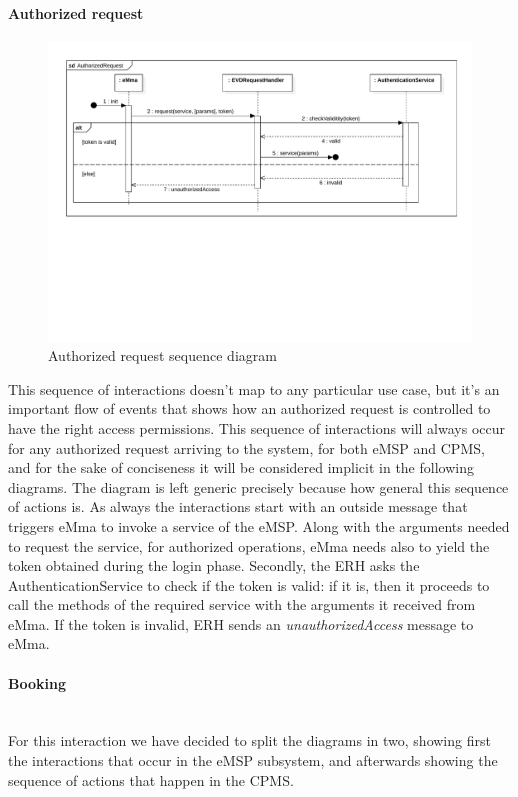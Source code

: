\paragraph{Authorized request}\mbox{}
\begin{figure}[H]
    \centering
    \includegraphics[trim={0 8.5cm 0 0},clip, width=1\textwidth]{Images/cp2/runtime/AuthorizedRequest.pdf}
    \caption{Authorized request sequence diagram}
    \label{fig:auth_request}
\end{figure}
This sequence of interactions doesn't map to any particular use case, but it's an important flow of events that shows how an authorized request is controlled to have the right access permissions. This sequence of interactions will always occur for any authorized request arriving to the system, for both eMSP and CPMS, and for the sake of conciseness it will be considered implicit in the following diagrams. The diagram is left generic precisely because how general this sequence of actions is. As always the interactions start with an outside message that triggers eMma to invoke a service of the eMSP. Along with the arguments needed to request the service, for authorized operations, eMma needs also to yield the token obtained during the login phase. Secondly, the ERH asks the AuthenticationService to check if the token is valid: if it is, then it proceeds to call the methods of the required service with the arguments it received from eMma. If the token is invalid, ERH sends an \textit{unauthorizedAccess} message to eMma.
\pagebreak

\paragraph{Booking}\mbox{}\\
For this interaction we have decided to split the diagrams in two, showing first the interactions that occur in the eMSP subsystem, and afterwards showing the sequence of actions that happen in the CPMS.

